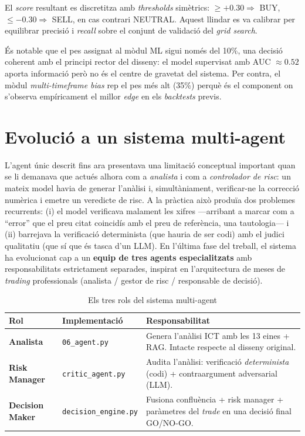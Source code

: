 \documentclass[12pt, a4paper]{report}
\begin{document}
El \textit{score} resultant es discretitza amb \emph{thresholds} simètrics: $\geq +0.30 \Rightarrow$ BUY, $\leq -0.30 \Rightarrow$ SELL, en cas contrari NEUTRAL. Aquest llindar es va calibrar per equilibrar precisió i \emph{recall} sobre el conjunt de validació del \textit{grid search}.

És notable que el pes assignat al mòdul ML sigui només del 10\%, una decisió coherent amb el principi rector del disseny: el model supervisat amb AUC $\approx 0.52$ aporta informació però no és el centre de gravetat del sistema. Per contra, el mòdul \emph{multi-timeframe bias} rep el pes més alt (35\%) perquè és el component on s'observa empíricament el millor \emph{edge} en els \textit{backtests} previs.

\section{Evolució a un sistema multi-agent}
\label{sec:multiagent}

L'agent únic descrit fins ara presentava una limitació conceptual important quan se li demanava que actués alhora com a \emph{analista} i com a \emph{controlador de risc}: un mateix model havia de generar l'anàlisi i, simultàniament, verificar-ne la correcció numèrica i emetre un veredicte de risc. A la pràctica això produïa dos problemes recurrents: (i) el model verificava malament les xifres ---arribant a marcar com a ``error'' que el preu citat coincidís amb el preu de referència, una tautologia--- i (ii) barrejava la verificació determinista (que hauria de ser codi) amb el judici qualitatiu (que sí que és tasca d'un LLM). En l'última fase del treball, el sistema ha evolucionat cap a un \textbf{equip de tres agents especialitzats} amb responsabilitats estrictament separades, inspirat en l'arquitectura de meses de \textit{trading} professionals (analista / gestor de risc / responsable de decisió).

\begin{table}[H]
\centering
\caption{Els tres rols del sistema multi-agent}
\label{tab:multiagent}
\begin{tabular}{@{}L{3.0cm}L{3.2cm}L{6.3cm}@{}}
\toprule
\textbf{Rol} & \textbf{Implementació} & \textbf{Responsabilitat} \\
\midrule
\textbf{Analista} & \texttt{06\_agent.py} & Genera l'anàlisi ICT amb les 13 eines + RAG. Intacte respecte al disseny original. \\
\textbf{Risk Manager} & \texttt{critic\_agent.py} & Audita l'anàlisi: verificació \emph{determinista} (codi) + contraargument adversarial (LLM). \\
\textbf{Decision Maker} & \texttt{decision\_engine.py} & Fusiona confluència + risk manager + paràmetres del \textit{trade} en una decisió final GO/NO-GO. \\
\bottomrule
\end{tabular}
\end{table}
\end{document}
